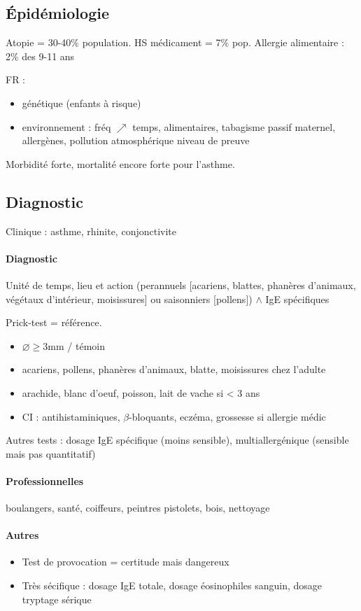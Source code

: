 \documentclass{article}
\begin{document}
\subsection{Épidémiologie}
Atopie = 30-40\% population. HS médicament = 7\% pop. Allergie alimentaire : 2\%
des 9-11 ans

FR : 
\begin{itemize}
\item génétique (enfants à risque)
\item environnement : fréq $\nearrow$ temps, alimentaires, tabagisme passif
  maternel, allergènes, pollution atmosphérique \danger niveau de preuve 
\end{itemize}
Morbidité forte, mortalité encore forte pour l'asthme.

\subsection{Diagnostic}
Clinique : asthme, rhinite, conjonctivite

\paragraph{Diagnostic}
Unité de temps, lieu et action (perannuels [acariens,
blattes, phanères d'animaux, végétaux d'intérieur, moisissures] ou saisonniers
[pollens]) $\wedge$ IgE spécifiques

Prick-test = référence.
\begin{itemize}
\item $\diameter \ge 3$mm / témoin
\item acariens, pollens, phanères d'animaux, blatte, moisissures chez l'adulte
\item arachide, blanc d'oeuf, poisson, lait de vache si < 3 ans
\item CI : antihistaminiques, $\beta$-bloquants, eczéma, grossesse si
  allergie médic
\end{itemize}

Autres tests : dosage IgE spécifique (moins sensible), multiallergénique (sensible mais
pas quantitatif)

\paragraph{Professionnelles} boulangers, santé, coiffeurs, peintres pistolets, bois, nettoyage\\

\paragraph{Autres}
\begin{itemize}
\item Test de provocation = certitude mais dangereux
\item Très sécifique : dosage IgE totale, dosage éosinophiles sanguin, dosage tryptage sérique
\end{itemize}
\end{document}

